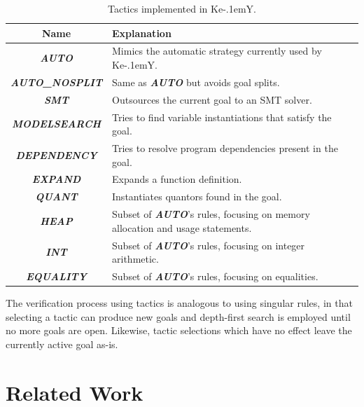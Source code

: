 \documentclass[runningheads,a4paper]{llncs}
\begin{document}
\begin{table}[ht]
	\begin{tabularx}{\textwidth}{ |c|X| } \hline
		Name & Explanation \\ \hline \hline
		
		\textbf{\textit{AUTO}} & Mimics the automatic strategy currently used by  Ke\kern-.1em{Y}. \\ \hline
		\textbf{\textit{AUTO\_NOSPLIT}} & Same as \textbf{\textit{AUTO}} but avoids goal splits. \\ \hline
		\textbf{\textit{SMT}} & Outsources the current goal to an SMT solver. \\ \hline
		\textbf{\textit{MODELSEARCH}} & Tries to find variable instantiations that satisfy the goal. \\ \hline
		\textbf{\textit{DEPENDENCY}} & Tries to resolve program dependencies present in the goal. \\ \hline
		\textbf{\textit{EXPAND}} & Expands a function definition. \\ \hline
		\textbf{\textit{QUANT}} & Instantiates quantors found in the goal. \\ \hline
		\textbf{\textit{HEAP}} & Subset of \textbf{\textit{AUTO}}'s rules, focusing on memory allocation and usage statements. \\ \hline
		\textbf{\textit{INT}} & Subset of \textbf{\textit{AUTO}}'s rules, focusing on integer arithmetic. \\ \hline
		\textbf{\textit{EQUALITY}} & Subset of \textbf{\textit{AUTO}}'s rules, focusing on equalities. \\ \hline
	\end{tabularx}
\vspace*{2pt}
\caption{Tactics implemented in Ke\kern-.1em{Y}.}
\label{t:tactics}
\end{table}

The verification process using tactics is analogous to using singular rules, in that selecting a tactic can produce new goals and depth-first search is employed until no more goals are open. Likewise, tactic selections which have no effect leave the currently active goal as-is.


\section*{Related Work}
\label{ss:rw}
\end{document}
